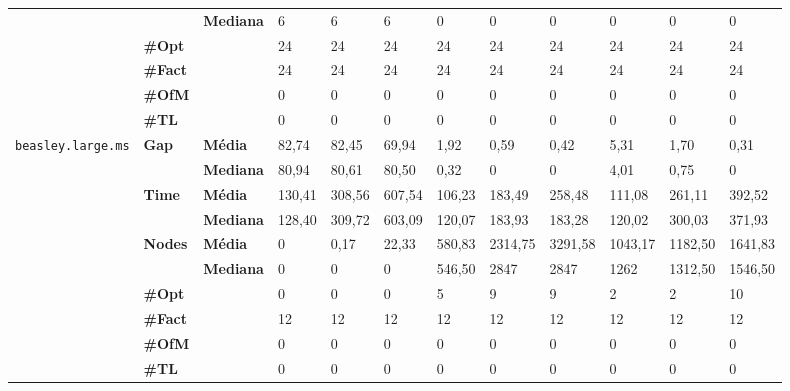 \begin{table}[]
\begin{adjustbox}{angle=90}
\begin{tabular}{cll|lll|lll|lll}
 & & \textbf{Mediana} & 6 & 6 & 6 & 0 & 0 & 0 & 0 & 0 & 0 \\
\cline{2-12}
 & \textbf{\#Opt} & & 24 & 24 & 24 & 24 & 24 & 24 & 24 & 24 & 24 \\
 & \textbf{\#Fact} & & 24 & 24 & 24 & 24 & 24 & 24 & 24 & 24 & 24 \\
 & \textbf{\#OfM} & & 0 & 0 & 0 & 0 & 0 & 0 & 0 & 0 & 0 \\
 & \textbf{\#TL} & & 0 & 0 & 0 & 0 & 0 & 0 & 0 & 0 & 0 \\
\hline
\multirow{7}{*}{\texttt{beasley.large.ms}} & \multirow{2}{*}{\textbf{Gap}} & \textbf{Média} & 82,74 & 82,45 & 69,94 & 1,92 & 0,59 & 0,42 & 5,31 & 1,70 & 0,31 \\
 & & \textbf{Mediana} & 80,94 & 80,61 & 80,50 & 0,32 & 0 & 0 & 4,01 & 0,75 & 0 \\
\cline{2-12}
 & \multirow{2}{*}{\textbf{Time}} & \textbf{Média} & 130,41 & 308,56 & 607,54 & 106,23 & 183,49 & 258,48 & 111,08 & 261,11 & 392,52 \\
 & & \textbf{Mediana} & 128,40 & 309,72 & 603,09 & 120,07 & 183,93 & 183,28 & 120,02 & 300,03 & 371,93 \\
\cline{2-12}
 & \multirow{2}{*}{\textbf{Nodes}} & \textbf{Média} & 0 & 0,17 & 22,33 & 580,83 & 2314,75 & 3291,58 & 1043,17 & 1182,50 & 1641,83 \\
 & & \textbf{Mediana} & 0 & 0 & 0 & 546,50 & 2847 & 2847 & 1262 & 1312,50 & 1546,50 \\
\cline{2-12}
 & \textbf{\#Opt} & & 0 & 0 & 0 & 5 & 9 & 9 & 2 & 2 & 10 \\
 & \textbf{\#Fact} & & 12 & 12 & 12 & 12 & 12 & 12 & 12 & 12 & 12 \\
 & \textbf{\#OfM} & & 0 & 0 & 0 & 0 & 0 & 0 & 0 & 0 & 0 \\
 & \textbf{\#TL} & & 0 & 0 & 0 & 0 & 0 & 0 & 0 & 0 & 0 \\
	\end{tabular}
	\end{adjustbox}
\end{table}

